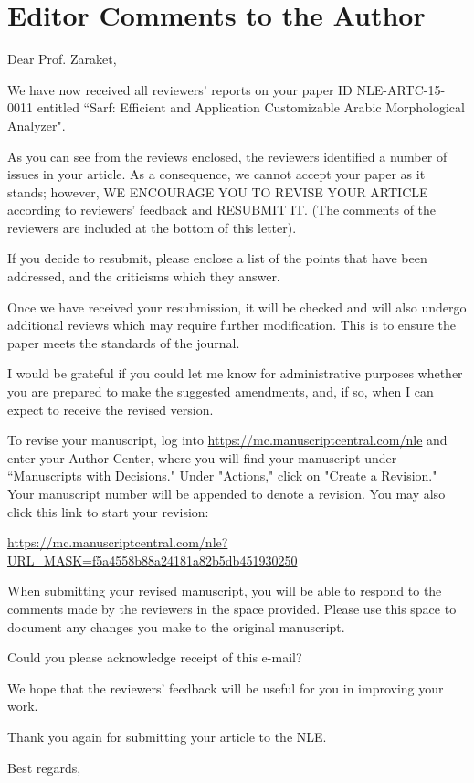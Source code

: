 \section*{Editor Comments to the Author}
Dear Prof. Zaraket,

We have now received all reviewers’ reports on your paper ID NLE-ARTC-15-0011 entitled ``Sarf: Efficient and Application Customizable Arabic Morphological Analyzer".

As you can see from the reviews enclosed, the reviewers identified a number of issues in your article.
As a consequence, we cannot accept your paper as it stands; however, WE ENCOURAGE YOU TO REVISE YOUR ARTICLE according to reviewers' feedback and RESUBMIT IT. (The comments of the reviewers are included at the bottom of this letter).

If you decide to resubmit, please enclose a list of the points that have been addressed, and the criticisms which they answer.

Once we have received your resubmission, it will be checked and will also undergo additional reviews which may require further modification. This is to ensure the paper meets the standards of the journal.

I would be grateful if you could let me know for administrative purposes whether you are prepared to make the suggested amendments, and, if so, when I can expect to receive the revised version.

To revise your manuscript, log into \url{https://mc.manuscriptcentral.com/nle} and enter your Author Center, where you will find your manuscript under ``Manuscripts with Decisions."  Under "Actions," click on "Create a Revision."  Your manuscript number will be appended to denote a revision. You may also click this link to start your revision:

\url{https://mc.manuscriptcentral.com/nle?URL_MASK=f5a4558b88a24181a82b5db451930250}

When submitting your revised manuscript, you will be able to respond to the comments made by the reviewers in the space provided.  Please use this space to document any changes you make to the original manuscript.

Could you please acknowledge receipt of this e-mail?

We hope that the reviewers' feedback will be useful for you in improving your work.

Thank you again for submitting your article to the NLE.

Best regards,

